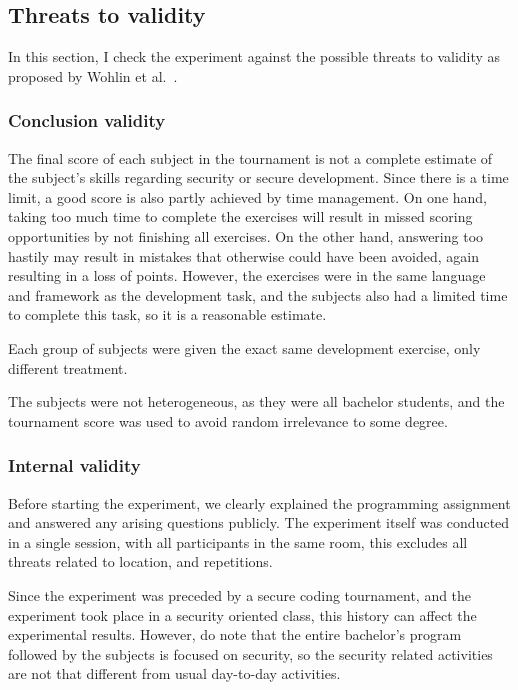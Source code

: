 \subsection{Threats to validity}
In this section, I check the experiment against the possible threats to validity as proposed by Wohlin et al.~\cite{wohlin2012experimentation}. 

\subsubsection{Conclusion validity}%
The final score of each subject in the tournament is not a complete estimate of the subject's skills regarding security or secure development.
Since there is a time limit, a good score is also partly achieved by time management.
On one hand, taking too much time to complete the exercises will result in missed scoring opportunities by not finishing all exercises.
On the other hand, answering too hastily may result in mistakes that otherwise could have been avoided, again resulting in a loss of points.
However, the exercises were in the same language and framework as the development task, and the subjects also had a limited time to complete this task, so it is a reasonable estimate.
 
Each group of subjects were given the exact same development exercise, only different treatment.
 
The subjects were not heterogeneous, as they were all bachelor students, and the tournament score was used to avoid random irrelevance to some degree.

\subsubsection{Internal validity}%
Before starting the experiment, we clearly explained the programming assignment and answered any arising questions publicly.
The experiment itself was conducted in a single session, with all participants in the same room, this excludes all threats related to location, and repetitions.

Since the experiment was preceded by a secure coding tournament, and the experiment took place in a security oriented class, this history can affect the experimental results.
However, do note that the entire bachelor's program followed by the subjects is focused on security, so the security related activities are not that different from usual day-to-day activities.

